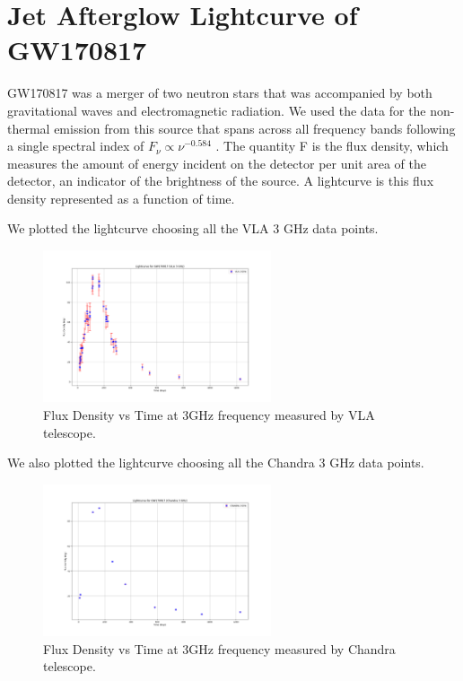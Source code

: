 \clearpage

\section{Jet Afterglow Lightcurve of GW170817}

GW170817 was a merger of two neutron stars that was accompanied by both gravitational waves and electromagnetic radiation. We used the data for the non-thermal emission from this source that spans across all frequency bands following a single spectral index of $F_{\nu} \propto {\nu}^{-0.584}$ . The quantity F is the flux density, which measures the amount of energy incident on the detector per unit area of the detector, an indicator of the brightness of the source. A lightcurve is this flux density represented as a function of time. 

We plotted the lightcurve choosing all the VLA 3 GHz data points.

\begin{figure}[H]
    \centering
    \includegraphics[width=0.6\textwidth]{Images/vla_lightcurve.png}
    \caption{Flux Density vs Time at 3GHz frequency measured by VLA telescope.}
    \label{fig:vla_lightcurve}
\end{figure}

\vspace{10mm}

We also plotted the lightcurve choosing all the Chandra 3 GHz data points.

\begin{figure}[H]
    \centering
    \includegraphics[width=0.6\textwidth]{Images/chandra_lightcurve.png}
    \caption{Flux Density vs Time at 3GHz frequency measured by Chandra telescope.}
    \label{fig:chandra_lightcurve}
\end{figure}

